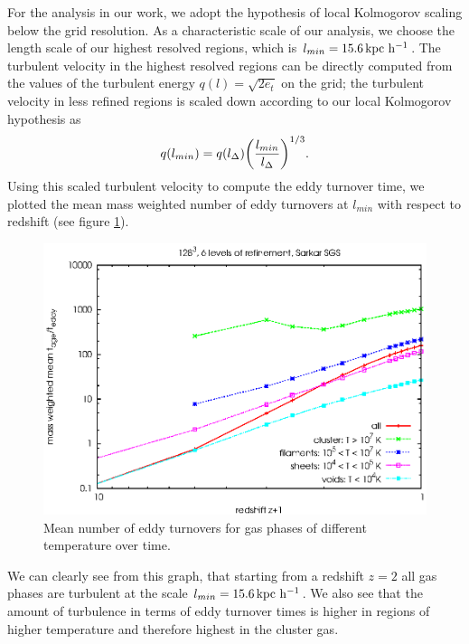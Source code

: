 For the analysis in our work, we adopt the hypothesis of local Kolmogorov
scaling below the grid resolution. As a characteristic scale of our analysis,
we choose the length scale of our highest resolved regions, which is 
$l_{min}=\unit[15.6]{kpc\ h^{-1}}$. The turbulent velocity in the highest
resolved regions can be directly computed from the values of the turbulent
energy $q(l) = \sqrt {2 e_t}$ on the grid; the turbulent velocity in less
refined regions is scaled down according to our local Kolmogorov hypothesis as
\begin{align}
q(l_{min}) = q(l_{\Delta}) { \left( \frac{l_{min}}{l_ {\Delta}} \right) }^{1/3}
\label{eq:vturbscaled}.
\end{align}
Using this scaled turbulent velocity to compute the eddy turnover time, we 
plotted the mean mass weighted number of eddy turnovers at $l_{min}$ with
respect to redshift (see figure \ref{fig:eddy}). 
\begin{figure}[tp]
\centering
\includegraphics[width=0.7\linewidth]{chapter9/eddy_red_sar.eps}
\caption{Mean number of eddy turnovers for gas phases of
different temperature over time.}
\label{fig:eddy}
\end{figure}
We can clearly see from this graph, that starting from a redshift $z=2$ all gas
phases are turbulent at the scale $l_{min}=\unit[15.6]{kpc\ h^{-1}}$. We also
see that the amount of turbulence in terms of eddy turnover times is higher in
regions of higher temperature and therefore highest in the cluster gas.    

